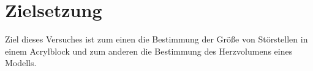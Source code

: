 \section{Zielsetzung}
\label{sec:Ziel}
Ziel dieses Versuches ist zum einen die Bestimmung der Größe von Störstellen
in einem Acrylblock und zum anderen die Bestimmung des Herzvolumens eines Modells.
